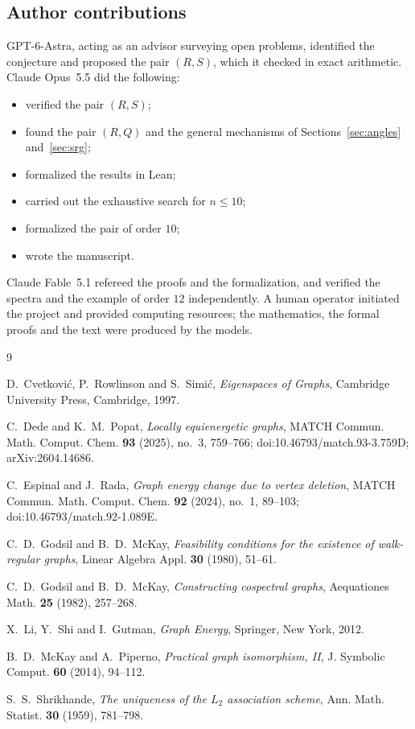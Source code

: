 \documentclass[11pt]{amsart}
\theoremstyle{remark}
\begin{document}
\subsection*{Author contributions}
GPT-6-Astra, acting as an advisor surveying open problems, identified the conjecture and proposed the pair $(R,S)$, which it checked in exact arithmetic.
Claude Opus~5.5 did the following:
\begin{itemize}
\item verified the pair $(R,S)$;
\item found the pair $(R,Q)$ and the general mechanisms of Sections~\ref{sec:angles} and~\ref{sec:srg};
\item formalized the results in Lean;
\item carried out the exhaustive search for $n\le10$;
\item formalized the pair of order $10$;
\item wrote the manuscript.
\end{itemize}
Claude Fable~5.1 refereed the proofs and the formalization, and verified the spectra and the example of order $12$ independently.
A human operator initiated the project and provided computing resources; the mathematics, the formal proofs and the text were produced by the models.

\begin{thebibliography}{9}

D.~Cvetkovi\'c, P.~Rowlinson and S.~Simi\'c,
\emph{Eigenspaces of Graphs},
Cambridge University Press, Cambridge, 1997.

C.~Dede and K.~M.~Popat,
\emph{Locally equienergetic graphs},
MATCH Commun. Math. Comput. Chem. \textbf{93} (2025), no.~3, 759--766; doi:10.46793/match.93-3.759D; arXiv:2604.14686.

C.~Espinal and J.~Rada,
\emph{Graph energy change due to vertex deletion},
MATCH Commun. Math. Comput. Chem. \textbf{92} (2024), no.~1, 89--103; doi:10.46793/match.92-1.089E.

C.~D.~Godsil and B.~D.~McKay,
\emph{Feasibility conditions for the existence of walk-regular graphs},
Linear Algebra Appl. \textbf{30} (1980), 51--61.

C.~D.~Godsil and B.~D.~McKay,
\emph{Constructing cospectral graphs},
Aequationes Math. \textbf{25} (1982), 257--268.

X.~Li, Y.~Shi and I.~Gutman,
\emph{Graph Energy},
Springer, New York, 2012.

B.~D.~McKay and A.~Piperno,
\emph{Practical graph isomorphism, II},
J. Symbolic Comput. \textbf{60} (2014), 94--112.

S.~S.~Shrikhande,
\emph{The uniqueness of the $L_2$ association scheme},
Ann. Math. Statist. \textbf{30} (1959), 781--798.

\end{thebibliography}
\end{document}
